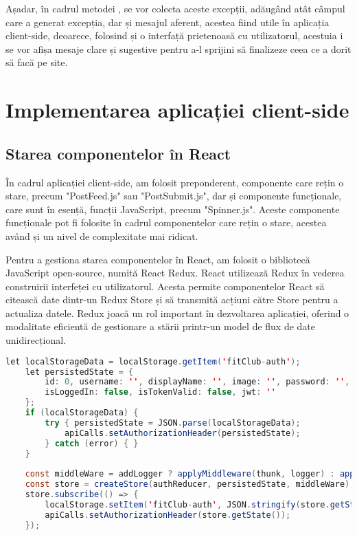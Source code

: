 Așadar, în cadrul metodei , se vor colecta aceste excepții, adăugând atât câmpul care a generat excepția, dar și mesajul aferent, acestea fiind utile în aplicația client-side, deoarece, folosind și o interfață prietenoasă cu utilizatorul, acestuia i se vor afișa mesaje clare și sugestive pentru a-l sprijini să finalizeze ceea ce a dorit să facă pe site.\newline

\section{Implementarea aplicației client-side}

\subsection{Starea componentelor în React}

În cadrul aplicației client-side, am folosit preponderent, componente care rețin o stare, precum "PostFeed.js" sau "PostSubmit.js", dar și componente funcționale, care sunt în esență, funcții JavaScript, precum "Spinner.js". Aceste componente funcționale pot fi folosite în cadrul componentelor care rețin o stare, acestea având și un nivel de complexitate mai ridicat.\newline

Pentru a gestiona starea componentelor în React, am folosit o bibliotecă JavaScript open-source, numită React Redux\cite{.reactreduxbook}. React utilizează Redux în vederea construirii interfeței cu utilizatorul. Acesta permite componentelor React să citească date dintr-un Redux Store și să transmită acțiuni către Store pentru a actualiza datele. Redux joacă un rol important în dezvoltarea aplicației, oferind o modalitate eficientă de gestionare a stării printr-un model de flux de date unidirecțional.\newline

\begin{lstlisting}[language=Java]
	let localStorageData = localStorage.getItem('fitClub-auth');
	let persistedState = {
		id: 0, username: '', displayName: '', image: '', password: '',
		isLoggedIn: false, isTokenValid: false, jwt: '' 
	};
	if (localStorageData) {
		try { persistedState = JSON.parse(localStorageData);
			apiCalls.setAuthorizationHeader(persistedState);
		} catch (error) { }
	}
	
	const middleWare = addLogger ? applyMiddleware(thunk, logger) : applyMiddleware(thunk)
	const store = createStore(authReducer, persistedState, middleWare);
	store.subscribe(() => { 
		localStorage.setItem('fitClub-auth', JSON.stringify(store.getState()));
		apiCalls.setAuthorizationHeader(store.getState());
	});
\end{lstlisting}
\bigskip

